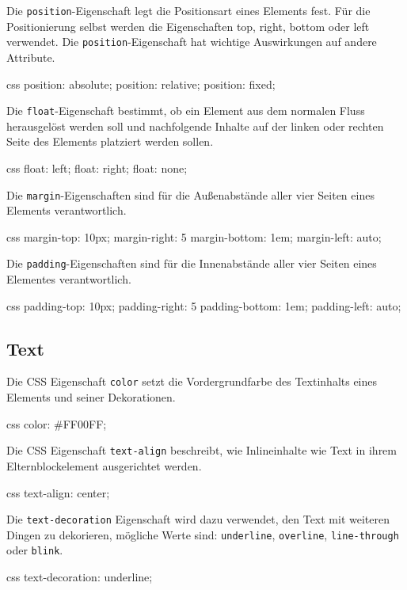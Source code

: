 \documentclass[10pt,a4paper]{article}
\begin{document}
\begin{multicols}{3}
Die \texttt{position}-Eigenschaft legt die Positionsart eines Elements fest. Für die Positionierung selbst werden die Eigenschaften top, right, bottom oder left verwendet. Die \texttt{position}-Eigenschaft hat wichtige Auswirkungen auf andere Attribute.
\begin{codebox}{css}{}
position: absolute;
position: relative;
position: fixed;
\end{codebox}

Die \texttt{float}-Eigenschaft bestimmt, ob ein Element aus dem normalen Fluss herausgelöst werden soll und nachfolgende Inhalte auf der linken oder rechten Seite des Elements platziert werden sollen.
\begin{codebox}{css}{}
float: left;
float: right;
float: none;
\end{codebox}

Die \texttt{margin}-Eigenschaften sind für die Außenabstände aller vier Seiten eines Elements verantwortlich.
\begin{codebox}{css}{}
margin-top: 10px;
margin-right: 5%
margin-bottom: 1em;
margin-left: auto;
\end{codebox}

Die \texttt{padding}-Eigenschaften sind für die Innenabstände aller vier Seiten eines Elementes verantwortlich.
\begin{codebox}{css}{}
padding-top: 10px;
padding-right: 5%
padding-bottom: 1em;
padding-left: auto;
\end{codebox}


\subsection*{Text}
Die CSS Eigenschaft \texttt{color} setzt die Vordergrundfarbe des Textinhalts eines Elements und seiner Dekorationen.
\begin{codebox}{css}{}
color: #FF00FF;
\end{codebox}

Die CSS Eigenschaft \texttt{text-align} beschreibt, wie Inlineinhalte wie Text in ihrem Elternblockelement ausgerichtet werden.
\begin{codebox}{css}{}
text-align: center;
\end{codebox}

Die \texttt{text-decoration} Eigenschaft wird dazu verwendet, den Text mit weiteren Dingen zu dekorieren, mögliche Werte sind: \texttt{underline}, \texttt{overline}, \texttt{line-through} oder \texttt{blink}.
\begin{codebox}{css}{}
text-decoration: underline;
\end{codebox}


\end{multicols}
\end{document}
